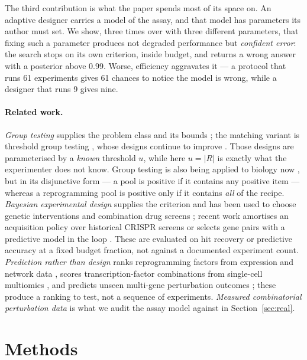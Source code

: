 \documentclass[10pt]{article}
\begin{document}
The third contribution is what the paper spends most of its space on. An
adaptive designer carries a model of the assay, and that model has parameters
its author must set. We show, three times over with three different
parameters, that fixing such a parameter produces not degraded performance but
\emph{confident error}: the search stops on its own criterion, inside budget,
and returns a wrong answer with a posterior above 0.99. Worse, efficiency
aggravates it --- a protocol that runs 61 experiments gives 61 chances to
notice the model is wrong, while a designer that runs 9 gives nine.

\paragraph{Related work.}
\emph{Group testing} supplies the problem class and its bounds
\citep{dorfman1943, aldridge2019}; the matching variant is threshold group
testing \citep{damaschke2006, chan2013}, whose designs continue to improve
\citep{bui2024}. Those designs are parameterised by a \emph{known} threshold
$u$, while here $u = |R|$ is exactly what the experimenter does not know.
Group testing is also being applied to biology now \citep{talamanca2026}, but
in its disjunctive form --- a pool is positive if it contains any positive
item --- whereas a reprogramming pool is positive only if it contains
\emph{all} of the recipe. \emph{Bayesian experimental design} supplies the
criterion \citep{lindley1956, chaloner1995, rainforth2024} and has been used to
choose genetic interventions \citep{zhang2023} and combination drug screens
\citep{tosh2025}; recent work amortises an acquisition policy over historical
CRISPR screens \citep{edwards2026} or selects gene pairs with a predictive
model in the loop \citep{qin2025}. These are evaluated on hit recovery or
predictive accuracy at a fixed budget fraction, not against a documented
experiment count. \emph{Prediction rather than design} ranks reprogramming
factors from expression and network data \citep{rackham2016}, scores
transcription-factor combinations from single-cell multiomics
\citep{tfcomb2025}, and predicts unseen multi-gene perturbation outcomes
\citep{roohani2022}; these produce a ranking to test, not a sequence of
experiments. \emph{Measured combinatorial perturbation data}
\citep{norman2019, joung2023, replogle2022, peidli2024} is what we audit the
assay model against in Section~\ref{sec:real}.

\section{Methods}
\label{sec:methods}
\end{document}
